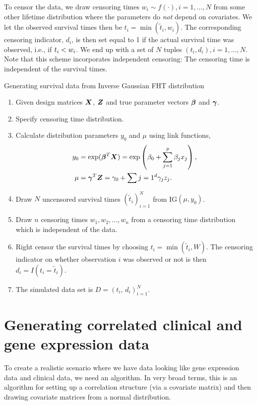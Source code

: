 To censor the data, we draw censoring times $w_i\sim f(\cdot),i=1,\ldots,N$ from some other lifetime distribution where the parameters do \textit{not} depend on covariates.
We let the observed survival times then be $t_i=\min(\tilde{t}_i,w_i)$.
The corresponding censoring indicator, $d_i$, is then set equal to 1 if the actual survival time was observed, i.e., if $t_{i}<w_i$.
We end up with a set of $N$ tuples $(t_i,d_i),i=1,\ldots,N$. Note that this scheme incorporates independent censoring: The censoring time is independent of the survival times.

\begin{algorithm}
\caption{Generating survival data from Inverse Gaussian FHT distribution}
\label{algo:FHT-sim}
\begin{enumerate}
    \item Given design matrices $\bm{X}$, $\bm{Z}$ and true parameter vectors $\boldsymbol{\beta}$ and $\boldsymbol{\gamma}$.
    \item Specify censoring time distribution.
    \item Calculate distribution parameters $y_0$ and $\mu$ using link functions,
        \begin{align*}
            y_0&=\exp(\boldsymbol{\beta}^T\bm{X})=\exp\left(\beta_0+\sum_{j=1}^p\beta_jx_j\right), \\
            \mu&=\boldsymbol{\gamma}^T\bm{Z}=\gamma_0+\sum{j=1}^d\gamma_jz_j.
        \end{align*}
    \item Draw $N$ uncensored survival times $(\tilde{t}_i)_{i=1}^N$ from IG$(\mu,y_0)$.
    \item Draw $n$ censoring times $w_1,w_2,\ldots,w_n$ from a censoring time distribution which is independent of the data.
    \item Right censor the survival times by choosing $t_i=\min(\tilde{t}_i,W)$.
          The censoring indicator on whether observation $i$ was observed or not is then $d_i=I(t_i=\tilde{t}_i)$.
    \item The simulated data set is $D=(t_i,\,d_i)_{i=1}^N$.
\end{enumerate}
\end{algorithm}

\section{Generating correlated clinical and gene expression data}
To create a realistic scenario where we have data looking like gene expression data and clinical data, we need an algorithm.
In very broad terms, this is an algorithm for setting up a correlation structure (via a covariate matrix) and then drawing covariate matrices from a normal distribution.

